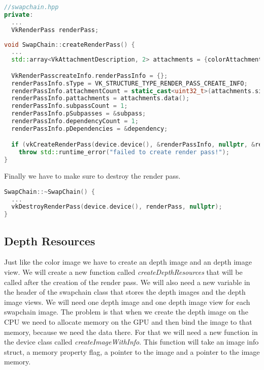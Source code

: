 \documentclass[12pt]{report} \usepackage{preamble}
\begin{document}
\begin{lstlisting}[language=C++]
//swapchain.hpp
private:
  ...
  VkRenderPass renderPass;
\end{lstlisting}

\begin{lstlisting}[language=C++]
void SwapChain::createRenderPass() {
  ...
  std::array<VkAttachmentDescription, 2> attachments = {colorAttachment, depthAttachment};

  VkRenderPasscreateInfo.renderPassInfo = {};
  renderPassInfo.sType = VK_STRUCTURE_TYPE_RENDER_PASS_CREATE_INFO;
  renderPassInfo.attachmentCount = static_cast<uint32_t>(attachments.size());
  renderPassInfo.pattachments = attachments.data();
  renderPassInfo.subpassCount = 1;
  renderPassInfo.pSubpasses = &subpass;
  renderPassInfo.dependencyCount = 1;
  renderPassInfo.pDependencies = &dependency;

  if (vkCreateRenderPass(device.device(), &renderPassInfo, nullptr, &renderPass) != VK_SUCCESS)
    throw std::runtime_error("failed to create render pass!");
}
\end{lstlisting}

Finally we have to make sure to destroy the render pass.

\begin{lstlisting}[language=C++]
SwapChain::~SwapChain() {
  ...
  vkDestroyRenderPass(device.device(), renderPass, nullptr);
}
\end{lstlisting}

\subsection{Depth Resources}

Just like the color image we have to create an depth image and an depth image view. We will create a new function
called \textit{createDepthResources} that will be called after the creation of the render pass. We will also need
a new variable in the header of the swapchain class that stores the depth images and the depth image views. We will need one
depth image and one depth image view for each swapchain image. The problem is that when we create the depth image on the \ac{CPU} we
need to allocate memory on the \ac{GPU} and then bind the image to that memory, because we need the data there.
For that we will need a new function in the device class called \textit{createImageWithInfo}.
This function will take an image info struct, a memory property flag, a pointer to the image and a pointer to the image memory.
\end{document}
